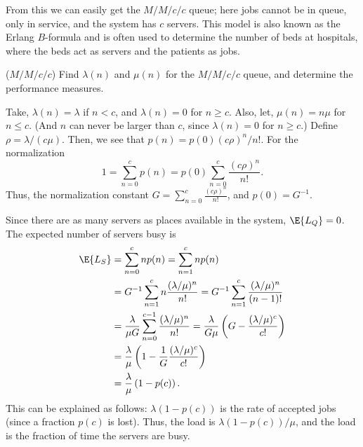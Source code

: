 From this we can easily get the $M/M/c/c$ queue; here jobs cannot be
in queue, only in service, and the system has $c$ servers.  This model
is also known as the Erlang $B$-formula and is often used to determine
the number of beds at hospitals, where the beds act as servers and the
patients as jobs.

\begin{exercise}\faCalculator ($M/M/c/c$)
  Find $\lambda(n)$ and $\mu(n)$ for the $M/M/c/c$ queue, and determine the performance measures.
  \begin{solution} Take,
    $\lambda(n) = \lambda$ if $n< c$, and $\lambda(n)=0$ for $n\geq c$. Also, let, $\mu(n) = n \mu$ for $n\leq c$. (And $n$ can never be larger than $c$, since $\lambda(n) = 0$ for $n\geq c$.) Define $\rho = \lambda/(c \mu)$. Then, we see that $p(n) = p(0)(c\rho)^n/n!$. For the normalization
    \begin{equation*}
      1=\sum_{n=0}^c p(n) = p(0) \sum_{n=0}^c \frac{(c\rho)^n}{n!}.
    \end{equation*}
Thus,  the normalization constant $G=\sum_{n=0}^{c} \frac{(c\rho)^n}{n!}$, and $p(0)=G^{-1}$. 

Since there are as many servers as places available in the system, $\E{L_Q}=0$. The expected number of servers busy is
    \begin{align*}
      \E{L_S} 
&= \sum_{n=0}^{c} n p(n) =  \sum_{n=1}^c n p(n)  \\
&= G^{-1} \sum_{n=1}^c n \frac{(\lambda/\mu)^n}{n!} 
= G^{-1} \sum_{n=1}^{c} \frac{(\lambda/\mu)^{n}}{(n-1)!} \\
&= \frac{\lambda}{\mu G} \sum_{n=0}^{c-1} \frac{(\lambda/\mu)^{n}}{n!} 
= \frac{\lambda}{G\mu} \left(G- \frac{(\lambda/\mu)^c}{c!}\right) \\
&= \frac{\lambda}{\mu} \left(1- \frac{1}G\frac{(\lambda/\mu)^c}{c!}\right) \\
&= \frac{\lambda}{\mu} \left(1- p(c)\right).
    \end{align*}
This can be explained as follows: $\lambda(1-p(c))$ is the rate of accepted jobs (since a fraction $p(c)$ is lost). Thus, the load is $\lambda(1-p(c))/\mu$, and the load is the fraction of time the servers are busy. 
  \end{solution}
\end{exercise}

